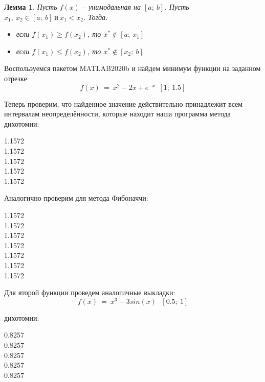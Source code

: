 \documentclass{article}
\newtheorem{lemma}{Лемма}
\begin{document}
\begin{lemma}
Пусть $f(x)$ -- унимодальная на $[a;~b]$. Пусть $x_1,~x_2 \in [a;~b]~и~x_1<x_2$. Тогда:
\begin{itemize}
    \item если $f(x_1)\ge f(x_2)$, то $x^{*}\notin[a;~x_1]$
    \item если $f(x_1)\le f(x_2)$, то $x^{*}\notin[x_2;~b]$
\end{itemize}
\end{lemma}
\noindent Воспользуемся пакетом MATLAB2020b и найдем минимум функции на заданном отрезке
$$f(x)~=~x^{2}-2x+e^{-x}~~[1;~1.5]$$
\begin{figure}[H]
\label{fig:image}
\end{figure}
\noindent Теперь проверим, что найденное значение действительно принадлежит всем интервалам неопределённости, которые находит наша программа метода дихотомии:
\begin{center}
1.1572 \in [1, 1.5]\\
1.1572 \in [1, 1.2505]\\
1.1572 \in [1.1249995, 1.2505]\\
1.1572 \in [1.1249995, 1.1878752505]\\
1.1572 \in [1.1563744994995, 1.1878752505]\\    
\end{center}
Аналогично проверим для метода Фибоначчи:
\begin{center}
1.1572 \in [1, 1.5]\\
1.1572 \in [1, 1.3095238095238095]\\
1.1572 \in [1.119047619047619, 1.3095238095238095]\\
1.1572 \in [1.119047619047619, 1.2380952380952381]\\
1.1572 \in [1.119047619047619, 1.1904761904761905]\\
1.1572 \in [1.1428571428571428, 1.1904761904761905]\\
1.1572 \in [1.1666666666666667, 1.1904761904761905]\\
\end{center}
Для второй функции проведем аналогичные выкладки:
$$f(x)~=~x^{3}-3sin(x)~~~[0.5;~1] $$
\begin{figure}[H]
\label{fig:image}
\end{figure}
 дихотомии:
\begin{center}
0.8257 \in [0.5, 1]\\
0.8257 \in [0.7495, 1]\\
0.8257 \in [0.7495, 0.8750005000000001]\\
0.8257 \in [0.8121247495, 0.8750005000000001]\\
0.8257 \in [0.8121247495, 0.8436255005005001]\\
\end{center}
\end{document}
